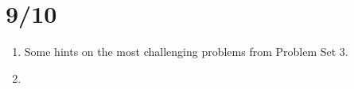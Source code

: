\documentclass[letterpaper,11pt,oneside,reqno]{amsart}
\numberwithin{equation}{section}
\theoremstyle{definition}
\begin{document}
\section{9/10}

\begin{enumerate}
	\item Some hints on the most challenging problems from Problem Set 3.
	\item 
\end{enumerate}

\end{document}
